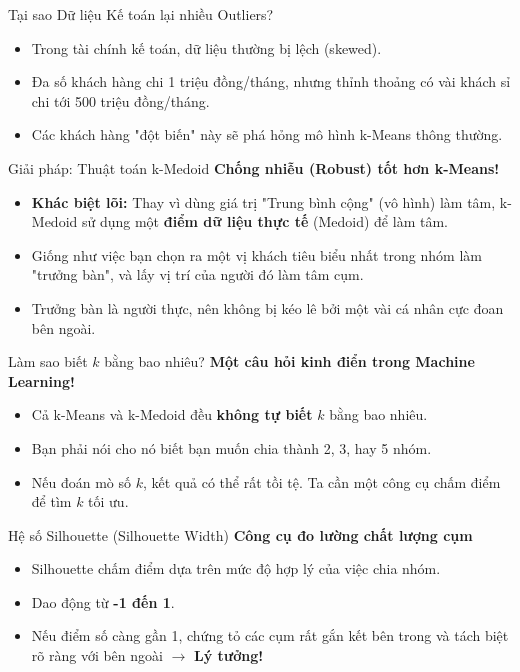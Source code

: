 \documentclass[aspectratio=169]{beamer}
\begin{document}
\begin{frame}{Tại sao Dữ liệu Kế toán lại nhiều Outliers?}
    \begin{itemize}
        \item Trong tài chính kế toán, dữ liệu thường bị lệch (skewed).
        \item Đa số khách hàng chi 1 triệu đồng/tháng, nhưng thỉnh thoảng có vài khách sỉ chi tới 500 triệu đồng/tháng.
        \item Các khách hàng "đột biến" này sẽ phá hỏng mô hình k-Means thông thường.
    \end{itemize}
\end{frame}

\begin{frame}{Giải pháp: Thuật toán k-Medoid}
    \textbf{Chống nhiễu (Robust) tốt hơn k-Means!}
    \begin{itemize}
        \item \textbf{Khác biệt lõi:} Thay vì dùng giá trị "Trung bình cộng" (vô hình) làm tâm, k-Medoid sử dụng một \textbf{điểm dữ liệu thực tế} (Medoid) để làm tâm.
        \item Giống như việc bạn chọn ra một vị khách tiêu biểu nhất trong nhóm làm "trưởng bàn", và lấy vị trí của người đó làm tâm cụm.
        \item Trưởng bàn là người thực, nên không bị kéo lê bởi một vài cá nhân cực đoan bên ngoài.
    \end{itemize}
\end{frame}

\begin{frame}{Làm sao biết $k$ bằng bao nhiêu?}
    \textbf{Một câu hỏi kinh điển trong Machine Learning!}
    \begin{itemize}
        \item Cả k-Means và k-Medoid đều \textbf{không tự biết} $k$ bằng bao nhiêu.
        \item Bạn phải nói cho nó biết bạn muốn chia thành 2, 3, hay 5 nhóm.
        \item Nếu đoán mò số $k$, kết quả có thể rất tồi tệ. Ta cần một công cụ chấm điểm để tìm $k$ tối ưu.
    \end{itemize}
\end{frame}

\begin{frame}{Hệ số Silhouette (Silhouette Width)}
    \textbf{Công cụ đo lường chất lượng cụm}
    \begin{itemize}
        \item Silhouette chấm điểm dựa trên mức độ hợp lý của việc chia nhóm.
        \item Dao động từ \textbf{-1 đến 1}.
        \item Nếu điểm số càng gần 1, chứng tỏ các cụm rất gắn kết bên trong và tách biệt rõ ràng với bên ngoài $\rightarrow$ \textbf{Lý tưởng!}
    \end{itemize}
\end{frame}
\end{document}
